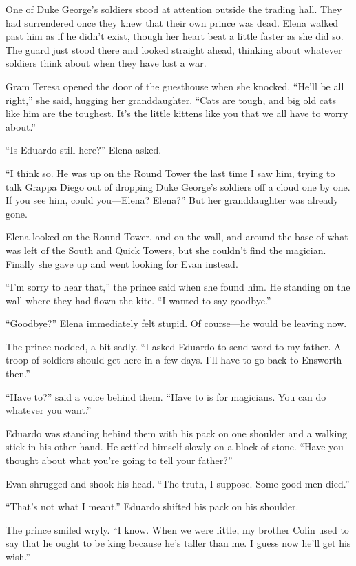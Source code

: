 \documentclass[10pt]{book}
\begin{document}
One of Duke George's soldiers stood at attention outside the trading hall. They had surrendered once they knew that their own prince was dead. Elena walked past him as if he didn't exist, though her heart beat a little faster as she did so. The guard just stood there and looked straight ahead, thinking about whatever soldiers think about when they have lost a war.

Gram Teresa opened the door of the guesthouse when she knocked. ``He'll be all right,'' she said, hugging her granddaughter. ``Cats are tough, and big old cats like him are the toughest. It's the little kittens like you that we all have to worry about.''

``Is Eduardo still here?'' Elena asked.

``I think so. He was up on the Round Tower the last time I saw him, trying to talk Grappa Diego out of dropping Duke George's soldiers off a cloud one by one. If you see him, could you---Elena? Elena?'' But her granddaughter was already gone.

Elena looked on the Round Tower, and on the wall, and around the base of what was left of the South and Quick Towers, but she couldn't find the magician. Finally she gave up and went looking for Evan instead.

``I'm sorry to hear that,'' the prince said when she found him. He standing on the wall where they had flown the kite. ``I wanted to say goodbye.''

``Goodbye?'' Elena immediately felt stupid. Of course---he would be leaving now.

The prince nodded, a bit sadly. ``I asked Eduardo to send word to my father. A troop of soldiers should get here in a few days. I'll have to go back to Ensworth then.''

``Have to?'' said a voice behind them. ``Have to is for magicians.  You can do whatever you want.''

Eduardo was standing behind them with his pack on one shoulder and a walking stick in his other hand. He settled himself slowly on a block of stone. ``Have you thought about what you're going to tell your father?''

Evan shrugged and shook his head. ``The truth, I suppose. Some good men died.''

``That's not what I meant.'' Eduardo shifted his pack on his shoulder.

The prince smiled wryly. ``I know. When we were little, my brother Colin used to say that he ought to be king because he's taller than me. I guess now he'll get his wish.''
\end{document}
